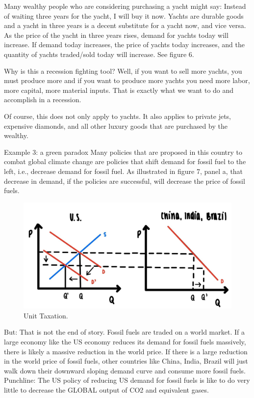 \documentclass[
]{book}
\begin{document}
Many wealthy people who are considering purchasing a yacht might say: Instead of waiting three years for the yacht, I will buy it now. Yachts are durable goods and a yacht in three years is a decent substitute for a yacht now, and vice versa. As the price of the yacht in three years rises, demand for yachts today will increase. If demand today increases, the price of yachts today increases, and the quantity of yachts traded/sold today will increase. See figure 6.

Why is this a recession fighting tool? Well, if you want to sell more yachts, you must produce more and if you want to produce more yachts you need more labor, more capital, more material inputs. That is exactly what we want to do and accomplish in a recession.

Of course, this does not only apply to yachts. It also applies to private jets, expensive diamonds, and all other luxury goods that are purchased by the wealthy.

Example 3: a green paradox
Many policies that are proposed in this country to combat global climate change are policies that shift demand for fossil fuel to the left, i.e., decrease demand for fossil fuel. As illustrated in figure 7, panel a, that decrease in demand, if the policies are successful, will decrease the price of fossil fuels.

\begin{figure}

{\centering \includegraphics[width=0.5\linewidth]{img/ch5/fig7} 

}

\caption{Unit Taxation.}\label{fig:fig507}
\end{figure}

But: That is not the end of story. Fossil fuels are traded on a world market. If a large economy like the US economy reduces its demand for fossil fuels massively, there is likely a massive reduction in the world price. If there is a large reduction in the world price of fossil fuels, other countries like China, India, Brazil will just walk down their downward sloping demand curve and consume more fossil fuels.
Punchline: The US policy of reducing US demand for fossil fuels is like to do very little to decrease the GLOBAL output of CO2 and equivalent gases.
\end{document}
